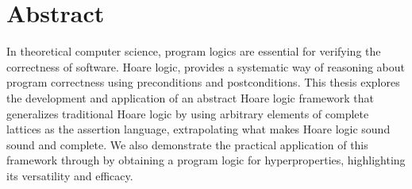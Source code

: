 {}
\begingroup

\chapter*{Abstract}

In theoretical computer science, program logics are essential for verifying the 
correctness of software. Hoare logic, provides a systematic way of reasoning 
about program correctness using preconditions and postconditions. This thesis 
explores the development and application of an abstract Hoare logic framework 
that generalizes traditional Hoare logic by using arbitrary elements of complete
lattices as the assertion language, extrapolating what makes Hoare logic sound
sound and complete. We also demonstrate the practical application of this 
framework through by obtaining a program logic for hyperproperties, 
highlighting its versatility and efficacy.

\vfill
